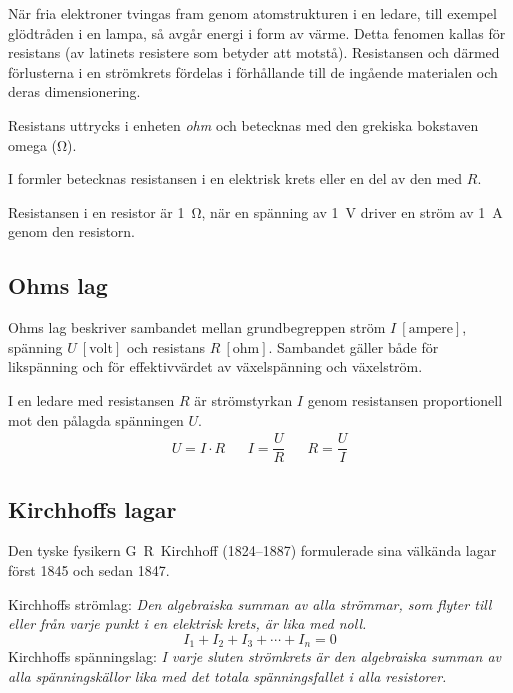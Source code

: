 När fria elektroner tvingas fram genom atomstrukturen i en ledare, till exempel
glödtråden i en lampa, så avgår energi i form av värme.
Detta fenomen kallas för resistans (av latinets resistere som betyder att
motstå).
Resistansen och därmed förlusterna i en strömkrets fördelas i
förhållande till de ingående materialen och deras dimensionering.

Resistans uttrycks i enheten \emph{ohm} \cite{SIbrochure8} och betecknas med
den grekiska bokstaven omega (\unit{\ohm}).

I formler betecknas resistansen i en elektrisk krets eller en del av den med
\(R\).

Resistansen i en resistor är \qty{1}{\ohm}, när en spänning av \qty{1}{\volt}
driver en ström av \qty{1}{\ampere} genom den resistorn.

\subsection{Ohms lag}
\label{ohms_lag}

Ohms lag beskriver sambandet mellan grundbegreppen ström
\(I\ \mathrm{[ampere]}\), spänning \(U\ \mathrm{[volt]}\) och resistans
\(R\ \mathrm{[ohm]}\).
Sambandet gäller både för likspänning och för effektivvärdet av växelspänning och
växelström.

I en ledare med resistansen \(R\) är strömstyrkan \(I\) genom resistansen
proportionell mot den pålagda spänningen \(U\).
\[
\begin{array}{lllll}U=I \cdot R & & I=\dfrac{U}{R} & & R=\dfrac{U}{I}\end{array}
\]
\subsection{Kirchhoffs lagar}

Den tyske fysikern G~R~Kirchhoff (1824--1887) formulerade sina välkända lagar
först 1845 och sedan 1847.

Kirchhoffs strömlag: \emph{Den algebraiska summan av alla strömmar, som flyter till eller från varje punkt i en elektrisk krets, är lika med noll.}
\[I_1 + I_2 + I_3 + \cdots + I_n = 0\]
Kirchhoffs spänningslag: \emph{I varje sluten strömkrets är den algebraiska summan av alla spänningskällor lika med det totala spänningsfallet i alla resistorer.}

